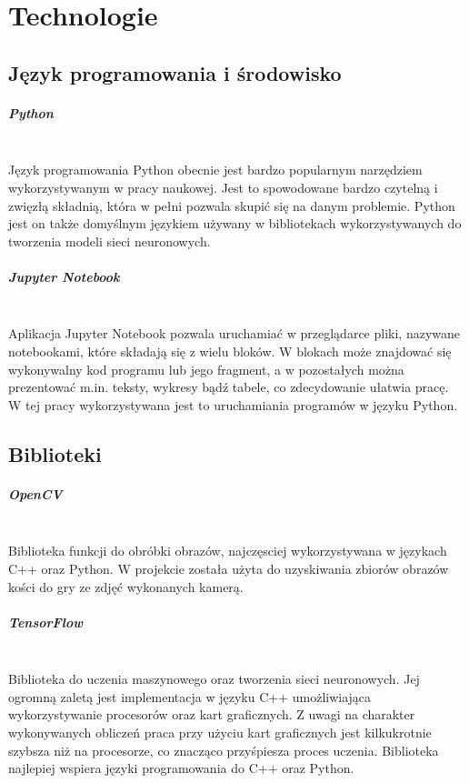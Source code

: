 
\chapter{Technologie}
\section{Język programowania i środowisko}

\paragraph{Python} \mbox{}\\
Język programowania Python obecnie jest bardzo popularnym narzędziem wykorzystywanym
w pracy naukowej. Jest to spowodowane bardzo czytelną i zwięzłą składnią,
która w pełni pozwala skupić się na danym problemie. Python jest on także domyślnym
językiem używany w bibliotekach wykorzystywanych do tworzenia modeli sieci neuronowych.

\paragraph{Jupyter Notebook} \mbox{}\\
Aplikacja Jupyter Notebook pozwala uruchamiać w przeglądarce pliki, nazywane notebookami,
które składają się z wielu bloków. W blokach może znajdować się wykonywalny kod programu
lub jego fragment, a w pozostałych można prezentować m.in. teksty, wykresy bądź tabele,
co zdecydowanie ułatwia pracę.\\
W tej pracy wykorzystywana jest to uruchamiania programów w języku Python.

\section{Biblioteki}

\paragraph{OpenCV} \mbox{}\\
Biblioteka funkcji do obróbki obrazów, najczęsciej wykorzystywana w językach C++
oraz Python. W projekcie została użyta do uzyskiwania zbiorów obrazów kości do gry
ze zdjęć wykonanych kamerą.

\paragraph{TensorFlow} \mbox{}\\
Biblioteka do uczenia maszynowego oraz tworzenia sieci neuronowych. Jej ogromną
zaletą jest implementacja w języku C++ umożliwiająca wykorzystywanie procesorów oraz
kart graficznych. Z uwagi na charakter wykonywanych obliczeń praca przy użyciu
kart graficznych jest kilkukrotnie szybsza niż na procesorze, co znacząco przyśpiesza
proces uczenia. Biblioteka najlepiej wspiera języki programowania do C++ oraz Python.


